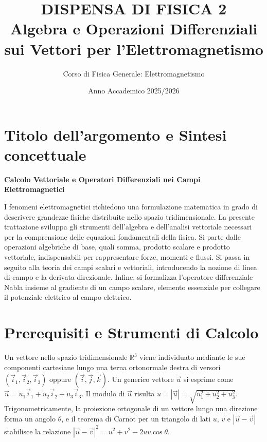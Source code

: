 \documentclass[12pt, a4paper]{article}
\title{\textbf{DISPENSA DI FISICA 2}\\ \Large Algebra e Operazioni Differenziali sui Vettori per l'Elettromagnetismo}
\author{Corso di Fisica Generale: Elettromagnetismo}
\date{Anno Accademico 2025/2026}
\begin{document}
\maketitle

\section{Titolo dell'argomento e Sintesi concettuale}

\textbf{Calcolo Vettoriale e Operatori Differenziali nei Campi Elettromagnetici}

I fenomeni elettromagnetici richiedono una formulazione matematica in grado di descrivere grandezze fisiche distribuite nello spazio tridimensionale. La presente trattazione sviluppa gli strumenti dell'algebra e dell'analisi vettoriale necessari per la comprensione delle equazioni fondamentali della fisica. Si parte dalle operazioni algebriche di base, quali somma, prodotto scalare e prodotto vettoriale, indispensabili per rappresentare forze, momenti e flussi. Si passa in seguito alla teoria dei campi scalari e vettoriali, introducendo la nozione di linea di campo e la derivata direzionale. Infine, si formalizza l'operatore differenziale Nabla insieme al gradiente di un campo scalare, elemento essenziale per collegare il potenziale elettrico al campo elettrico.

\section{Prerequisiti e Strumenti di Calcolo}

\begin{tcolorbox}[title={BOX 1: Richiamo Matematico, Vettori, Componenti e Trigonometria}]
Un vettore nello spazio tridimensionale $\mathbb{R}^3$ viene individuato mediante le sue componenti cartesiane lungo una terna ortonormale destra di versori $(\vec{i}_1, \vec{i}_2, \vec{i}_3)$ oppure $(\vec{i}, \vec{j}, \vec{k})$. Un generico vettore $\vec{u}$ si esprime come $\vec{u} = u_1 \vec{i}_1 + u_2 \vec{i}_2 + u_3 \vec{i}_3$. Il modulo di $\vec{u}$ risulta $u = |\vec{u}| = \sqrt{u_1^2 + u_2^2 + u_3^2}$. Trigonometricamente, la proiezione ortogonale di un vettore lungo una direzione forma un angolo $\theta$, e il teorema di Carnot per un triangolo di lati $u$, $v$ e $|\vec{u}-\vec{v}|$ stabilisce la relazione $|\vec{u}-\vec{v}|^2 = u^2 + v^2 - 2uv \cos\theta$.
\end{tcolorbox}
\end{document}
